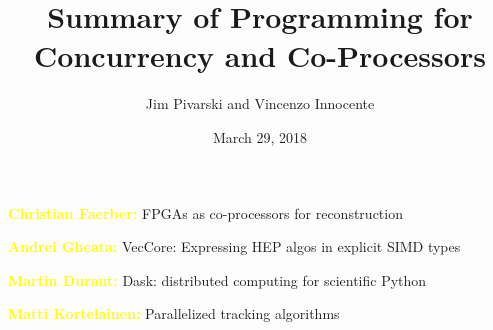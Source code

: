 \documentclass[aspectratio=169]{beamer}
\title[2018-03-29-concurrency-summary]{Summary of Programming for Concurrency and Co-Processors}
\author{Jim Pivarski and Vincenzo Innocente}
\date{March 29, 2018}
\begin{document}

\begin{frame}
  \titlepage
\end{frame}




\begin{frame}{\textcolor{yellow}{\bf Christian Faerber:} FPGAs as co-processors for reconstruction}
\vspace{0.5 cm}
\end{frame}

\begin{frame}{\textcolor{yellow}{\bf Andrei Gheata:} VecCore: Expressing HEP algos in explicit SIMD types}
\vspace{0.5 cm}
\end{frame}

\begin{frame}{\textcolor{yellow}{\bf Martin Durant:} Dask: distributed computing for scientific Python}
\vspace{0.25 cm}


\end{frame}

\begin{frame}{\textcolor{yellow}{\bf Matti Kortelainen:} Parallelized tracking algorithms}
\vspace{0.5 cm}
\end{frame}
\end{document}
